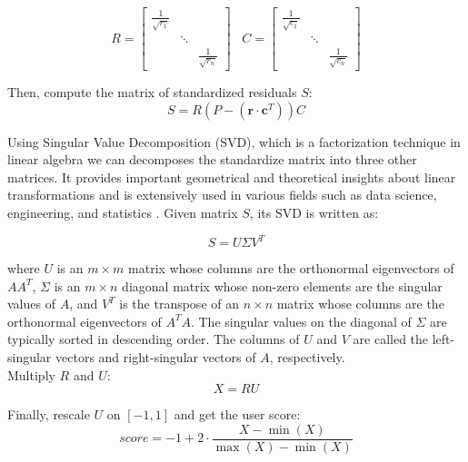 \begin{equation}
  R =
  \begin{bmatrix}
    \frac{1}{{\sqrt{r_{1}}}} & & \\
    & \ddots & \\
    & & \frac{1}{{\sqrt{r_{n}}}}
  \end{bmatrix}
  \;\;\;  C =
  \begin{bmatrix}
    \frac{1}{{\sqrt{c_{1}}}} & & \\
    & \ddots & \\
    & & \frac{1}{{\sqrt{c_{n}}}}
  \end{bmatrix}
\end{equation}

Then, compute the matrix of standardized residuals $S$:
\begin{equation}
S = R\left(P - (\textbf{r}\cdot \textbf{c}^T)\right)C
\end{equation}

Using Singular Value Decomposition (SVD), which  is a factorization technique in linear algebra we can decomposes the standardize matrix into three other matrices. It provides important geometrical and theoretical insights about linear transformations and is extensively used in various fields such as data science, engineering, and statistics \cite{golub1970singular}. Given  matrix $S$, its SVD is  written as:

\begin{equation}
S = U\Sigma V^T
\end{equation}

where $U$ is an $m \times m$ matrix whose columns are the orthonormal eigenvectors of $AA^T$, $\Sigma$ is an $m \times n$ diagonal matrix whose non-zero elements are the singular values of $A$, and $V^T$ is the transpose of an $n \times n$ matrix whose columns are the orthonormal eigenvectors of $A^T A$. The singular values on the diagonal of $\Sigma$ are typically sorted in descending order. The columns of $U$ and $V$ are called the left-singular vectors and right-singular vectors of $A$, respectively.
\\

Multiply $R$ and $U$:
\begin{equation}
X = R U
\end{equation}

Finally, rescale $U$ on $[-1,1]$ and get the user score:
\begin{equation}
score = -1 + 2 \cdot \frac{{X} - \min(X)}{\max(X) - \min(X)}
\end{equation}








